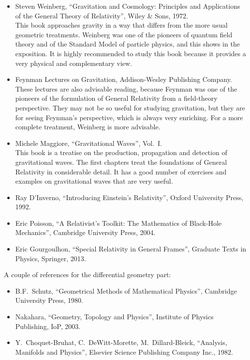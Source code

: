 \begin{itemize}[label={},leftmargin=0pt,itemsep=0.6em]
This book is also very formal and requires being comfortable with a more advanced mathematical language.
\item Steven Weinberg, ``Gravitation and Cosmology: Principles and Applications of the General Theory of Relativity'', Wiley \& Sons, 1972.\\
This book approaches gravity in a way that differs from the more usual geometric treatments. Weinberg was one of the pioneers of quantum field theory and of the Standard Model of particle physics, and this shows in the exposition. It is highly recommended to study this book because it provides a very physical and complementary view.
\item Feynman Lectures on Gravitation, Addison-Wesley Publishing Company.\\
These lectures are also advisable reading, because Feynman was one of the pioneers of the formulation of General Relativity from a field-theory perspective. They may not be so useful for studying gravitation, but they are for seeing Feynman's perspective, which is always very enriching. For a more complete treatment, Weinberg is more advisable.
\item Michele Maggiore, ``Gravitational Waves'', Vol.~I.\\
This book is a treatise on the production, propagation and detection of gravitational waves. The first chapters treat the foundations of General Relativity in considerable detail. It has a good number of exercises and examples on gravitational waves that are very useful.
\item Ray D'Inverno, ``Introducing Einstein's Relativity'', Oxford University Press, 1992.
\item Eric Poisson, ``A Relativist's Toolkit: The Mathematics of Black-Hole Mechanics'', Cambridge University Press, 2004.
\item Eric Gourgoulhon, ``Special Relativity in General Frames'', Graduate Texts in Physics, Springer, 2013.
\end{itemize}
A couple of references for the differential geometry part:
\begin{itemize}[label={},leftmargin=0pt,itemsep=0.3em]
\item B.F.~Schutz, ``Geometrical Methods of Mathematical Physics'', Cambridge University Press, 1980.
\item Nakahara, ``Geometry, Topology and Physics'', Institute of Physics Publishing, IoP, 2003.
\item Y.~Choquet-Bruhat, C.~DeWitt-Morette, M.~Dillard-Bleick, ``Analysis, Manifolds and Physics'', Elsevier Science Publishing Company Inc., 1982.
\end{itemize}

